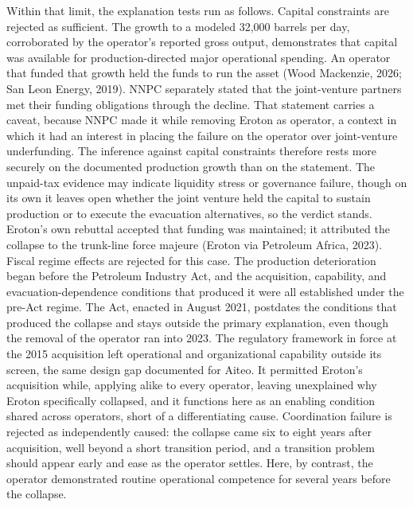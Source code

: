\documentclass[twoside,fontset=lmodern]{mitthesis}
\begin{document}
Within that limit, the explanation tests run as follows. Capital
constraints are rejected as sufficient. The growth to a modeled 32,000
barrels per day, corroborated by the operator's reported gross output,
demonstrates that capital was available for production-directed major
operational spending. An operator that funded that growth held the funds
to run the asset (Wood Mackenzie, 2026; San Leon Energy, 2019). NNPC
separately stated that the joint-venture partners met their funding
obligations through the decline. That statement carries a caveat,
because NNPC made it while removing Eroton as operator, a context in
which it had an interest in placing the failure on the operator over
joint-venture underfunding. The inference against capital constraints
therefore rests more securely on the documented production growth than
on the statement. The unpaid-tax evidence may indicate liquidity stress
or governance failure, though on its own it leaves open whether the
joint venture held the capital to sustain production or to execute the
evacuation alternatives, so the verdict stands. Eroton's own rebuttal
accepted that funding was maintained; it attributed the collapse to the
trunk-line force majeure (Eroton via Petroleum Africa, 2023). Fiscal
regime effects are rejected for this case. The production deterioration
began before the Petroleum Industry Act, and the acquisition,
capability, and evacuation-dependence conditions that produced it were
all established under the pre-Act regime. The Act, enacted in August
2021, postdates the conditions that produced the collapse and stays
outside the primary explanation, even though the removal of the operator
ran into 2023. The regulatory framework in force at the 2015 acquisition
left operational and organizational capability outside its screen, the
same design gap documented for Aiteo. It permitted Eroton's acquisition
while, applying alike to every operator, leaving unexplained why Eroton
specifically collapsed, and it functions here as an enabling condition
shared across operators, short of a differentiating cause. Coordination
failure is rejected as independently caused: the collapse came six to
eight years after acquisition, well beyond a short transition period,
and a transition problem should appear early and ease as the operator
settles. Here, by contrast, the operator demonstrated routine
operational competence for several years before the collapse.
\end{document}
